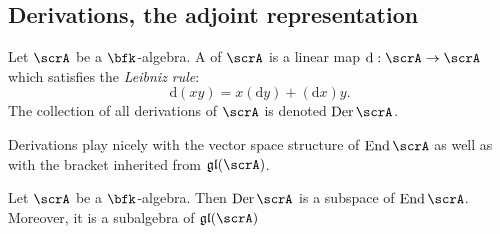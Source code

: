\documentclass{article}
\DeclareMathOperator{\End}{End}
\DeclareMathOperator{\Der}{Der}
\newcommand{\dd}{\ensuremath{\text{d}}}
\newcommand*\glalg{\ensuremath{\mathfrak{gl}}}
\begin{document}
\subsection{Derivations, the adjoint representation}

\begin{definition}
    Let $\scrA$ be a $\bfk$-algebra.
    A  of $\scrA$ is a linear map $\dd: \scrA \to \scrA$ which satisfies the \textit{Leibniz rule}:
    \[
        \dd(xy)
        =
        x(\dd y) + (\dd x) y.
    \]
    The collection of all derivations of $\scrA$ is denoted $\Der \scrA$.
\end{definition}

Derivations play nicely with the vector space structure of $\End \scrA$ as well as with the bracket inherited from $\glalg(\scrA)$.

\begin{proposition}
    Let $\scrA$ be a $\bfk$-algebra.
    Then $\Der \scrA$ is a subspace of $\End \scrA$.
    Moreover, it is a subalgebra of $\glalg(\scrA)$
\end{proposition}
\end{document}
